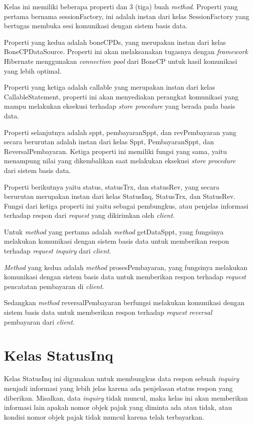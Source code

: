 Kelas ini memiliki beberapa properti dan 3 (tiga) buah \textit{method}. Properti yang pertama bernama sessionFactory, ini adalah instan dari kelas SessionFactory yang bertugas membuka sesi komunikasi dengan sistem basis data.

Properti yang kedua adalah boneCPDs, yang merupakan instan dari kelas BoneCPDataSource. Properti ini akan melaksanakan tugasnya dengan \textit{framework} Hibernate menggunakan \textit{connection pool} dari BoneCP untuk hasil komunikasi yang lebih optimal.

Properti yang ketiga adalah callable yang merupakan instan dari kelas CallableStatement, properti ini akan menyediakan perangkat komunikasi yang mampu melakukan eksekusi terhadap \textit{store procedure} yang berada pada basis data.

Properti selanjutnya adalah sppt, pembayaranSppt, dan revPembayaran yang secara berurutan adalah instan dari kelas Sppt, PembayaranSppt, dan ReversalPembayaran. Ketiga properti ini memiliki fungsi yang sama, yaitu menampung nilai yang dikembalikan saat melakukan eksekusi \textit{store procedure} dari sistem basis data.

Properti berikutnya yaitu status, statusTrx, dan statusRev, yang secara berurutan merupakan instan dari kelas StatusInq, StatusTrx, dan StatusRev. Fungsi dari ketiga properti ini yaitu sebagai pembungkus, atau penjelas informasi terhadap respon dari \textit{request} yang dikirimkan oleh \textit{client}.

Untuk \textit{method} yang pertama adalah \textit{method} getDataSppt, yang fungsinya melakukan komunikasi dengan sistem basis data untuk memberikan respon terhadap \textit{request inquiry} dari \textit{client}.

\textit{Method} yang kedua adalah \textit{method} prosesPembayaran, yang fungsinya melakukan komunikasi dengan sistem basis data untuk memberikan respon terhadap \textit{request} pencatatan pembayaran di \textit{client}.

Sedangkan \textit{method} reversalPembayaran berfungsi melakukan komunikasi dengan sistem basis data untuk memberikan respon terhadap \textit{request reversal} pembayaran dari \textit{client}.

\section{Kelas StatusInq}

Kelas StatusInq ini digunakan untuk membungkus data respon sebuah \textit{inquiry} menjadi informasi yang lebih jelas karena ada penjelasan status respon yang diberikan. Misalkan, data \textit{inquiry} tidak muncul, maka kelas ini akan memberikan informasi lain apakah nomor objek pajak yang diminta ada atau tidak, atau kondisi nomor objek pajak tidak muncul karena telah terbayarkan.

